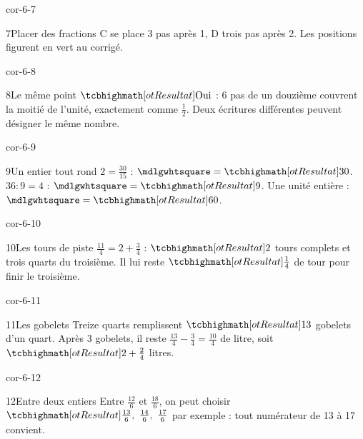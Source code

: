 \begin{blocLivre}{cor-6-7}\begin{corrige}{7}{Placer des fractions}
C se place 3 pas après 1, D trois pas après 2. Les positions figurent en vert au corrigé.
\label{fig-cor-6-7}
\end{corrige}\end{blocLivre}
\begin{blocLivre}{cor-6-8}\begin{corrige}{8}{Le même point}
$\res{\text{Oui}}$ : 6 pas de un douzième couvrent la moitié de l’unité, exactement comme $\frac12$. Deux écritures différentes peuvent désigner le même nombre.
\label{fig-cor-6-8}
\end{corrige}\end{blocLivre}
\begin{blocLivre}{cor-6-9}\begin{corrige}{9}{Un entier tout rond}
$2=\frac{30}{15}$ : $\square=\res{30}$. $36:9=4$ : $\square=\res9$. Une unité entière : $\square=\res{60}$.
\end{corrige}\end{blocLivre}
\begin{blocLivre}{cor-6-10}\begin{corrige}{10}{Les tours de piste}
$\frac{11}4=2+\frac34$ : $\res2$ tours complets et trois quarts du troisième. Il lui reste $\res{\frac14}$ de tour pour finir le troisième.
\end{corrige}\end{blocLivre}
\begin{blocLivre}{cor-6-11}\begin{corrige}{11}{Les gobelets}
Treize quarts remplissent $\res{13}$ gobelets d’un quart. Après 3 gobelets, il reste $\frac{13}4-\frac34=\frac{10}4$ de litre, soit $\res{2+\frac24}$ litres.
\end{corrige}\end{blocLivre}
\begin{blocLivre}{cor-6-12}\begin{corrige}{12}{Entre deux entiers}
Entre $\frac{12}6$ et $\frac{18}6$, on peut choisir $\res{\frac{13}6,\ \frac{14}6,\ \frac{17}6}$ par exemple : tout numérateur de 13 à 17 convient.
\end{corrige}\end{blocLivre}
